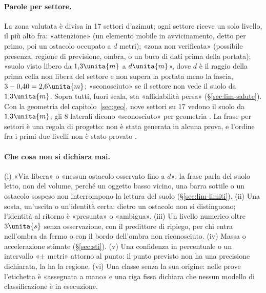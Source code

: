 \paragraph{Parole per settore.} La zona valutata è divisa in 17 settori d'azimut; ogni settore riceve un solo livello, il più alto fra: «attenzione» (un elemento mobile in avvicinamento, detto per primo, poi un ostacolo occupato a $d$ metri); «zona non verificata» (possibile presenza, regione di previsione, ombra, o un buco di dati prima della portata); «suolo visto libero da $1{,}3\unita{m}$ a $d\unita{m}$», dove $d$ è il raggio della prima cella non libera del settore e non supera la portata meno la fascia, $3-0{,}40=2{,}6\unita{m}$; «sconosciuto» se il settore non vede il suolo da $1{,}3\unita{m}$. Sopra tutti, fuori scala, sta «affidabilità persa» (\S\ref{sec:lim-salute}). Con la geometria del capitolo~\ref{sec:geo}, nove settori su 17 vedono il suolo da $1{,}3\unita{m}$; gli 8 laterali dicono «sconosciuto» per geometria . La frase per settori è una regola di progetto: non è stata generata in alcuna prova, e l'ordine fra i primi due livelli non è stato provato .

\paragraph{Che cosa non si dichiara mai.} (i) «Via libera» o «nessun ostacolo osservato fino a $d$»: la frase parla del suolo letto, non del volume, perché un oggetto basso vicino, una barra sottile o un ostacolo sospeso non interrompono la lettura del suolo (\S\ref{sec:lim-limiti}). (ii) Una sosta, un'uscita o un'identità certa: dietro un ostacolo non si distinguono; l'identità al ritorno è «presunta» o «ambigua». (iii) Un livello numerico oltre $3\unita{s}$ senza osservazione, con il predittore di ripiego, per chi entra nell'ombra da fermo o con il bordo dell'ombra non riconosciuto. (iv) Massa o accelerazione stimate (\S\ref{sec:sti}). (v) Una confidenza in percentuale o un intervallo «$\pm$ metri» attorno al punto: il punto previsto non ha una precisione dichiarata, la ha la regione. (vi) Una classe senza la sua origine: nelle prove l'etichetta è «assegnata a mano» e una riga fissa dichiara che nessun modello di classificazione è in esecuzione.

